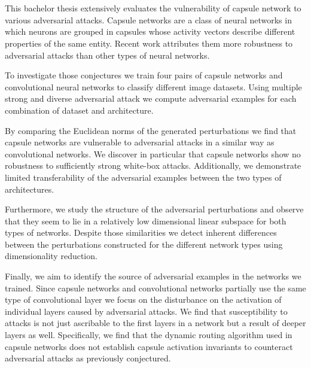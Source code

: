 \section*{}

This bachelor thesis extensively evaluates the vulnerability of capsule network to various adversarial attacks.
Capsule networks are a class of neural networks in which neurons are grouped in capsules whose activity vectors describe different properties of the same entity.
Recent work attributes them more robustness to adversarial attacks than other types of neural networks.

To investigate those conjectures we train four pairs of capsule networks and convolutional neural networks to classify different image datasets.
Using multiple strong and diverse adversarial attack we compute adversarial examples for each combination of dataset and architecture.

By comparing the Euclidean norms of the generated perturbations we find that capsule networks are vulnerable to adversarial attacks in a similar way as convolutional networks.
We discover in particular that capsule networks show no robustness to sufficiently strong white-box attacks.
Additionally, we demonstrate limited transferability of the adversarial examples between the two types of architectures.

Furthermore, we study the structure of the adversarial perturbations and observe that they seem to lie in a relatively low dimensional linear subspace for both types of networks.
Despite those similarities we detect inherent differences between the perturbations constructed for the different network types using dimensionality reduction.

Finally, we aim to identify the source of adversarial examples in the networks we trained.
Since capsule networks and convolutional networks partially use the same type of convolutional layer we focus on the disturbance on the activation of individual layers caused by adversarial attacks.
We find that susceptibility to attacks is not just ascribable to the first layers in a network but a result of deeper layers as well.
Specifically, we find that the dynamic routing algorithm used in capsule networks does not establish capsule activation invariants to counteract adversarial attacks as previously conjectured.